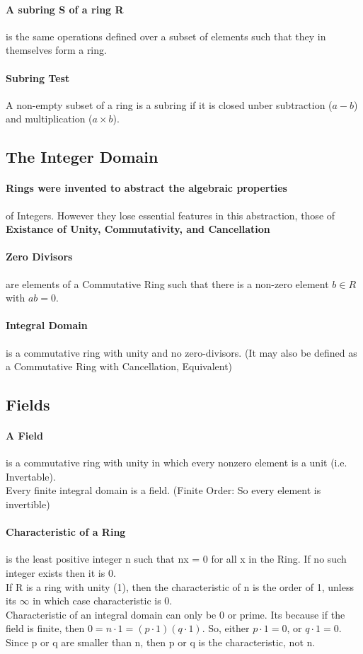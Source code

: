 \paragraph{A subring S of a ring R} is the same operations defined over a subset of elements such that they in themselves form a ring.
\paragraph{Subring Test} A non-empty subset of a ring is a subring if it is closed unber subtraction ($a - b$) and multiplication ($a \times b$).


\subsection{The Integer Domain}

\paragraph{Rings were invented to abstract the algebraic properties} of Integers. However they lose essential features in this abstraction, those of \textbf{Existance of Unity, Commutativity, and Cancellation}
\paragraph{Zero Divisors} are elements of a Commutative Ring such that there is a non-zero element $b \in R$ with $ab = 0$.
\paragraph{Integral Domain} is a commutative ring with unity and no zero-divisors. (It may also be defined as a Commutative Ring with Cancellation, Equivalent)


\subsection{Fields}

\paragraph{A Field} is a commutative ring with unity in which every nonzero element is a unit (i.e. Invertable).
\\ Every finite integral domain is a field. (Finite Order: So every element is invertible)

\paragraph{Characteristic of a Ring} is the least positive integer n such that nx = 0 for all x in the Ring. If no such integer exists then it is 0.
\\ If R is a ring with unity (1), then the characteristic of n is the order of 1, unless its $\infty$ in which case characteristic is 0.
\\ Characteristic of an integral domain can only be 0 or prime. Its because if the field is finite, then $0 = n \cdot 1 = (p \cdot 1)(q \cdot 1)$. So, either $p \cdot 1 = 0$, or $q \cdot 1 = 0$. Since p or q are smaller than n, then p or q is the characteristic, not n. 
